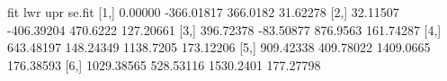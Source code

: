 \begin{Schunk}
\begin{Soutput}
            fit        lwr       upr    se.fit
[1,]    0.00000 -366.01817  366.0182  31.62278
[2,]   32.11507 -406.39204  470.6222 127.20661
[3,]  396.72378  -83.50877  876.9563 161.74287
[4,]  643.48197  148.24349 1138.7205 173.12206
[5,]  909.42338  409.78022 1409.0665 176.38593
[6,] 1029.38565  528.53116 1530.2401 177.27798
\end{Soutput}
\end{Schunk}
